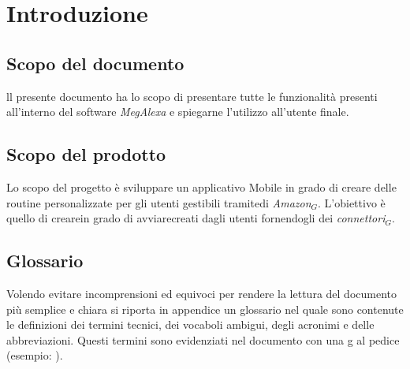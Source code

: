 \chapter{Introduzione}
\label{Introduzione}

\section{Scopo del documento}
ll presente documento ha lo scopo di presentare tutte le funzionalità presenti all'interno del software \textit{MegAlexa} e spiegarne l'utilizzo all'utente finale.

\section{Scopo del prodotto}
Lo scopo del progetto è sviluppare un applicativo Mobile in grado di creare delle routine personalizzate per gli utenti gestibili tramitedi \textit{Amazon$_{G}$}. L’obiettivo è quello di crearein grado di avviarecreati dagli utenti fornendogli dei \textit{connettori$_{G}$}.


\section{Glossario}
Volendo evitare incomprensioni ed equivoci per rendere la lettura del documento più semplice
e chiara si riporta in appendice un glossario nel quale sono contenute le definizioni dei
termini tecnici, dei vocaboli ambigui, degli acronimi e delle abbreviazioni. Questi termini
sono evidenziati nel documento con una g al pedice (esempio: ).
